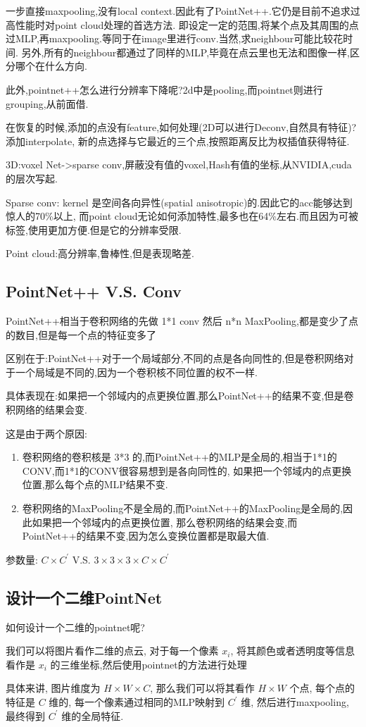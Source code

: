 一步直接maxpooling,没有local context.因此有了PointNet++.它仍是目前不追求过高性能时对point cloud处理的首选方法.
即设定一定的范围,将某个点及其周围的点过MLP,再maxpooling.等同于在image里进行conv.当然,求neighbour可能比较花时间.
另外,所有的neighbour都通过了同样的MLP,毕竟在点云里也无法和图像一样,区分哪个在什么方向.

此外,pointnet++怎么进行分辨率下降呢?2d中是pooling,而pointnet则进行grouping,从前面借.

在恢复的时候,添加的点没有feature,如何处理(2D可以进行Deconv,自然具有特征)?添加interpolate,
新的点选择与它最近的三个点,按照距离反比为权插值获得特征.

3D:voxel Net->sparse conv,屏蔽没有值的voxel,Hash有值的坐标,从NVIDIA,cuda的层次写起.

Sparse conv: kernel 是空间各向异性(spatial anisotropic)的.因此它的acc能够达到惊人的70\%以上,
而point cloud无论如何添加特性,最多也在64\%左右.而且因为可被标签,使用更加方便.但是它的分辨率受限.

Point cloud:高分辨率,鲁棒性,但是表现略差.

\subsection{PointNet++ V.S. Conv}

PointNet++相当于卷积网络的先做 1*1 conv 然后 n*n MaxPooling,都是变少了点的数目,但是每一个点的特征变多了

区别在于:PointNet++对于一个局域部分,不同的点是各向同性的,但是卷积网络对于一个局域是不同的,因为一个卷积核不同位置的权不一样.

具体表现在:如果把一个邻域内的点更换位置,那么PointNet++的结果不变,但是卷积网络的结果会变.

这是由于两个原因:
\begin{enumerate}
    \item 卷积网络的卷积核是 3*3 的,而PointNet++的MLP是全局的,相当于1*1的CONV,而1*1的CONV很容易想到是各向同性的,
    如果把一个邻域内的点更换位置,那么每个点的MLP结果不变.
    \item 卷积网络的MaxPooling不是全局的,而PointNet++的MaxPooling是全局的,因此如果把一个邻域内的点更换位置,
    那么卷积网络的结果会变,而PointNet++的结果不变,因为怎么变换位置都是取最大值.
\end{enumerate}

参数量: $C\times C^\prime$ V.S. $3\times 3\times 3\times C\times C^\prime$

\subsection{设计一个二维PointNet}

如何设计一个二维的pointnet呢?

我们可以将图片看作二维的点云, 对于每一个像素 $x_i$, 将其颜色或者透明度等信息看作是 $x_i$ 的三维坐标,然后使用pointnet的方法进行处理

具体来讲, 图片维度为 $H\times W\times C$, 那么我们可以将其看作 $H\times W$ 个点, 每个点的特征是 $C$ 维的, 
每一个像素通过相同的MLP映射到 $C^\prime$ 维, 然后进行maxpooling, 最终得到 $C^\prime$ 维的全局特征.